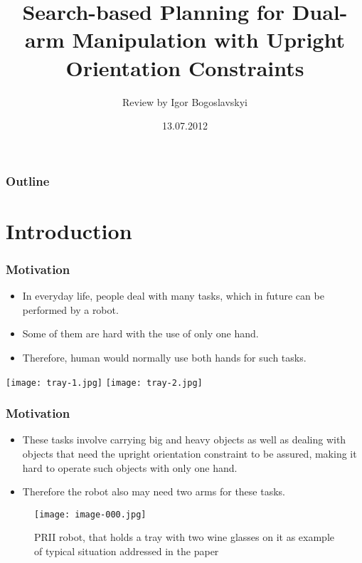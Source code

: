\documentclass{beamer}
\title{Search-based Planning for Dual-arm Manipulation with Upright Orientation
Constraints}
\author{Review by Igor Bogoslavskyi}
\institute[Universities of]
{
Department Of Computer Science\\
Albert Ludwigs Universitat Freiburg\\
email: bogoslai@informatik.uni-freiburg.de}
\date{13.07.2012}
\begin{document}
\begin{frame}
\titlepage
\end{frame}

\begin{frame}
\frametitle{Outline}
\tableofcontents
\end{frame}


\section{Introduction}
\begin{frame}
\frametitle{Motivation} 
\begin{itemize}
  \item In everyday life, people deal with many tasks, which in future can be
  performed by a robot.
  \item Some of them are hard with the use of only one hand.   	
  \item Therefore, human would normally use both hands for such tasks.
\end{itemize}
\begin{center}
	\texttt{[image: tray-1.jpg]}
	\texttt{[image: tray-2.jpg]}
\end{center}
\end{frame}

\begin{frame}
\frametitle{Motivation} 
\begin{itemize}
  \item These tasks involve carrying big and heavy objects as well as dealing
  with objects that need the upright orientation constraint to be assured,
  making it hard to operate such objects with only one hand.
  \item Therefore the robot also may need two arms for these tasks. 	
\end{itemize}
\begin{figure}[]
\centering
\texttt{[image: image-000.jpg]}
\caption{PRII robot, that holds a tray with two wine glasses on it as example of typical situation addressed in the paper}
\label{fig:PR2 with glasses}
\end{figure}
\end{frame}
\end{document}
